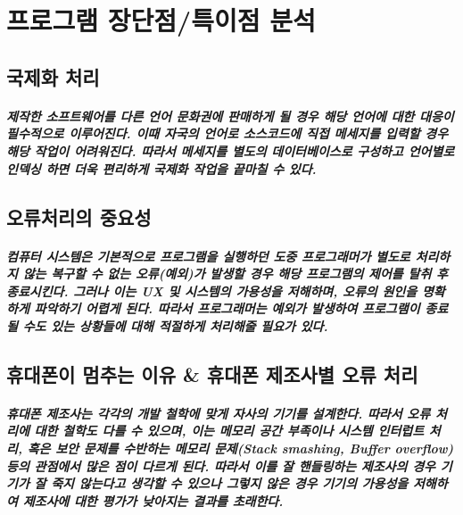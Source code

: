 \documentclass[UTF8]{report}
\begin{document}
    \chapter{프로그램 장단점/특이점 분석}
            \section{국제화 처리}
            \paragraph{%
                \normalfont 제작한 소프트웨어를 다른 언어 문화권에 판매하게 될 경우 해당 언어에 대한 대응이 필수적으로 이루어진다. 이때 자국의 언어로 소스코드에 직접 메세지를 입력할 경우 해당 작업이 어려워진다. 따라서 메세지를 별도의 데이터베이스로 구성하고 언어별로 인덱싱 하면 더욱 편리하게 국제화 작업을 끝마칠 수 있다.
            }

            \section{오류처리의 중요성}
            \paragraph{%
                \normalfont 컴퓨터 시스템은 기본적으로 프로그램을 실행하던 도중 프로그래머가 별도로 처리하지 않는 복구할 수 없는 오류(예외)가 발생할 경우 해당 프로그램의 제어를 탈취 후 종료시킨다. 그러나 이는 UX 및 시스템의 가용성을 저해하며, 오류의 원인을 명확하게 파악하기 어렵게 된다. 따라서 프로그래머는 예외가 발생하여 프로그램이 종료될 수도 있는 상황들에 대해 적절하게 처리해줄 필요가 있다.
            }

            \section{휴대폰이 멈추는 이유 \& 휴대폰 제조사별 오류 처리}
            \paragraph{%
                \normalfont 휴대폰 제조사는 각각의 개발 철학에 맞게 자사의 기기를 설계한다. 따라서 오류 처리에 대한 철학도 다를 수 있으며, 이는 메모리 공간 부족이나 시스템 인터럽트 처리, 혹은 보안 문제를 수반하는 메모리 문제(Stack smashing, Buffer overflow) 등의 관점에서 많은 점이 다르게 된다. 따라서 이를 잘 핸들링하는 제조사의 경우 기기가 잘 죽지 않는다고 생각할 수 있으나 그렇지 않은 경우 기기의 가용성을 저해하여 제조사에 대한 평가가 낮아지는 결과를 초래한다.
            }
\end{document}
